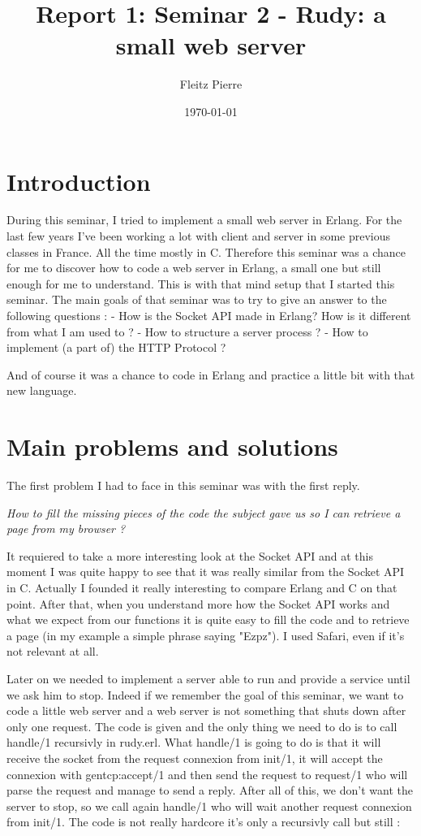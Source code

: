 \documentclass[a4paper, 11pt]{article}
\title{Report 1: Seminar 2 - Rudy: a small web server}
\author{Fleitz Pierre}
\date{\today{}}
\begin{document}
\maketitle

\section{Introduction}

During this seminar, I tried to implement a small web server in Erlang. 
For the last few years I've been working a lot with client and server in some previous classes in France. All the time mostly in C. Therefore this seminar was a chance for me to discover how to code a web server in Erlang, a small one but still enough for me to understand. This is with that mind setup that I started this seminar.
The main goals of that seminar was to try to give an answer to the following questions :
  - How is the Socket API made in Erlang? How is it different from what I am used to ?
  - How to structure a server process ? 
  - How to implement (a part of) the HTTP Protocol ?

And of course it was a chance to code in Erlang and practice a little bit with that new language.

\section{Main problems and solutions}

The first problem I had to face in this seminar was with the first reply. 

\textit{
How to fill the missing pieces of the code the subject gave us so I can retrieve a page from my browser ? 
}

It requiered to take a more interesting look at the Socket API and at this moment I was quite happy to see that it was really similar from the Socket API in C. Actually I founded it really interesting to compare Erlang and C on that point. 
After that, when you understand more how the Socket API works and what we expect from our functions it is quite easy to fill the code and to retrieve a page (in my example a simple phrase saying "Ezpz"). I used Safari, even if it’s not relevant at all. 

Later on we needed to implement a server able to run and provide a service until we ask him to stop. 
Indeed if we remember the goal of this seminar, we want to code a little web server and a web server is not something that shuts down after only one request. The code is given and the only thing we need to do is to call handle/1 recursivly in rudy.erl. What handle/1 is going to do is that it will receive the socket from the request connexion from init/1, it will accept the connexion with gentcp:accept/1 and then send the request to request/1 who will parse the request and manage to send a reply. After all of this, we don't want the server to stop, so we call again handle/1 who will wait another request connexion from init/1.
The code is not really hardcore it's only a recursivly call but still :
\end{document}
